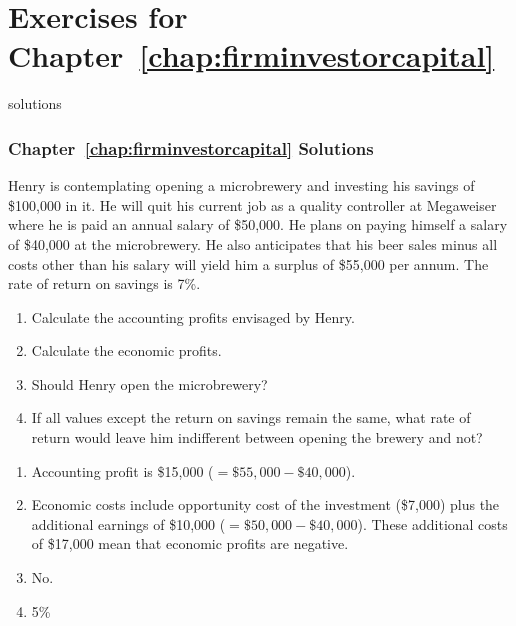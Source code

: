 \newpage
\section*{Exercises for Chapter~\ref{chap:firminvestorcapital}}

\begin{Filesave}{solutions}
\subsubsection*{Chapter~\ref{chap:firminvestorcapital} Solutions}
\end{Filesave}

\begin{enumialphparenastyle}

\begin{econex}\label{ex:ch7ex1}
Henry is contemplating opening a microbrewery and investing his savings of \$100,000 in it. He will quit his current job as a quality controller at Megaweiser where he is paid an annual salary of \$50,000. He plans on paying himself a salary of \$40,000 at the microbrewery. He also anticipates that his beer sales minus all costs other than his salary will yield him a surplus of \$55,000 per annum. The rate of return on savings is 7\%.
\begin{enumerate}
	\item Calculate the accounting profits envisaged by Henry.
	\item Calculate the economic profits.
	\item Should Henry open the microbrewery?
	\item If all values except the return on savings remain the same, what rate of return would leave him indifferent between opening the brewery and not?
\end{enumerate}
\begin{econsolution}
\begin{enumerate}
	\item	Accounting profit is \$15,000 ($=\$55,000-\$40,000$).
	\item	Economic costs include opportunity cost of the investment (\$7,000) plus the additional earnings of \$10,000 ($=\$50,000-\$40,000$). These additional costs of \$17,000 mean that economic profits are negative.
	\item	No.
	\item	5\%
\end{enumerate}
\end{econsolution}
\end{econex}


\end{enumialphparenastyle}
